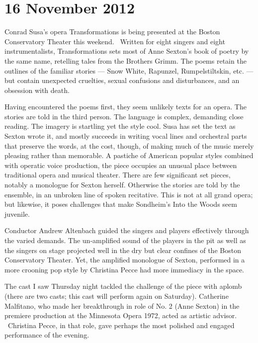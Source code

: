 
\chapter{16 November 2012}

Conrad Susa’s opera Transformations is being presented at the Boston Conservatory Theater this weekend.  Written for eight singers and eight instrumentalists, Transformations sets most of Anne Sexton’s book of poetry by the same name, retelling tales from the Brothers Grimm. The poems retain the outlines of the familiar stories — Snow White, Rapunzel, Rumpelstiltskin, etc. — but contain unexpected cruelties, sexual confusions and disturbances, and an obsession with death.

Having encountered the poems first, they seem unlikely texts for an opera. The stories are told in the third person. The language is complex, demanding close reading. The imagery is startling yet the style cool. Susa has set the text as Sexton wrote it, and mostly succeeds in writing vocal lines and orchestral parts that preserve the words, at the cost, though, of making much of the music merely pleasing rather than memorable. A pastiche of American popular styles combined with operatic voice production, the piece occupies an unusual place between traditional opera and musical theater. There are few significant set pieces, notably a monologue for Sexton herself. Otherwise the stories are told by the ensemble, in an unbroken line of spoken recitative. This is not at all grand opera; but likewise, it poses challenges that make Sondheim’s Into the Woods seem juvenile.

Conductor Andrew Altenbach guided the singers and players effectively through the varied demands. The un-amplified sound of the players in the pit as well as the singers on stage projected well in the dry but clear confines of the Boston Conservatory Theater. Yet, the amplified monologue of Sexton, performed in a more crooning pop style by Christina Pecce had more immediacy in the space.

The cast I saw Thursday night tackled the challenge of the piece with aplomb (there are two casts; this cast will perform again on Saturday). Catherine Malfitano, who made her breakthrough in role of No. 2 (Anne Sexton) in the premiere production at the Minnesota Opera 1972, acted as artistic advisor.  Christina Pecce, in that role, gave perhaps the most polished and engaged performance of the evening.

